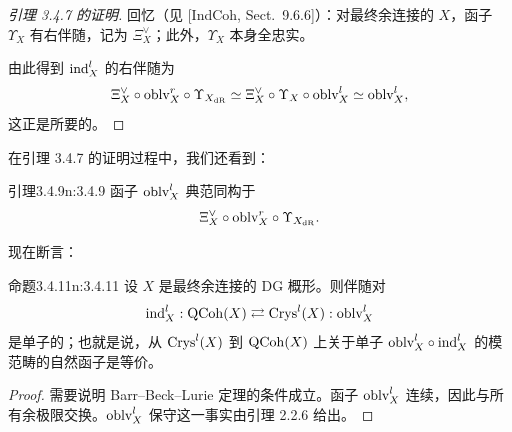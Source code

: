 \begin{proof}[引理 3.4.7 的证明]
回忆（见 [IndCoh, Sect.~9.6.6]）：对最终余连接的 $X$，函子 $\Upsilon_X$ 有右伴随，记为 $\Xi^{\vee}_X$；此外，$\Upsilon_X$ 本身全忠实。

由此得到 $\mathrm{ind}^l_X$ 的右伴随为
\[
\Xi^{\vee}_X\circ\mathrm{oblv}^r_X\circ\Upsilon_{X_{\mathrm{dR}}}\simeq\Xi^{\vee}_X\circ\Upsilon_X\circ\mathrm{oblv}^l_X\simeq\mathrm{oblv}^l_X,
\]
这正是所要的。
\end{proof}

在引理 3.4.7 的证明过程中，我们还看到：

\begin{othm}{引理}{3.4.9}{n:3.4.9}
函子 $\mathrm{oblv}^l_X$ 典范同构于
\[
\Xi^{\vee}_X\circ\mathrm{oblv}^r_X\circ\Upsilon_{X_{\mathrm{dR}}}.
\]
\end{othm}

现在断言：

\begin{othm}{命题}{3.4.11}{n:3.4.11}
设 $X$ 是最终余连接的 DG 概形。则伴随对
\[
\mathrm{ind}^l_X:\mathrm{QCoh}(X)\rightleftarrows\mathrm{Crys}^l(X):\mathrm{oblv}^l_X
\]
是单子的；也就是说，从 $\mathrm{Crys}^l(X)$ 到 $\mathrm{QCoh}(X)$ 上关于单子 $\mathrm{oblv}^l_X\circ\mathrm{ind}^l_X$ 的模范畴的自然函子是等价。
\end{othm}

\begin{proof}
需要说明 Barr--Beck--Lurie 定理的条件成立。函子 $\mathrm{oblv}^l_X$ 连续，因此与所有余极限交换。$\mathrm{oblv}^l_X$ 保守这一事实由引理 2.2.6 给出。
\end{proof}
